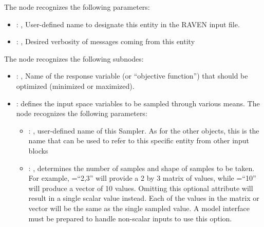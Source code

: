   The  node recognizes the following parameters:
    \begin{itemize}
      \item {}: ,
        User-defined name to designate this entity in the RAVEN input file.
      \item {}: ,
        Desired verbosity of messages coming from this entity
  \end{itemize}

  The  node recognizes the following subnodes:
  \begin{itemize}
    \item {}: ,
      Name of the response variable (or ``objective function'') that should be optimized
      (minimized or maximized).

    \item {}:
      defines the input space variables to be sampled through various means.
      The  node recognizes the following parameters:
        \begin{itemize}
          \item {}: ,
            user-defined name of this Sampler. \nb As for the other objects,               this is
            the name that can be used to refer to this specific entity from other input blocks
          \item {}: ,
            determines the number of samples and shape of samples               to be taken.  For
            example, =``2,3'' will provide a 2 by 3               matrix of values,
            while =``10'' will produce a vector of 10 values.               Omitting
            this optional attribute will result in a single scalar value instead.               Each
            of the values in the matrix or vector will be the same as the single sampled value.
            \nb A model interface must be prepared to handle non-scalar inputs to use this option.
      \end{itemize}


\end{itemize}

